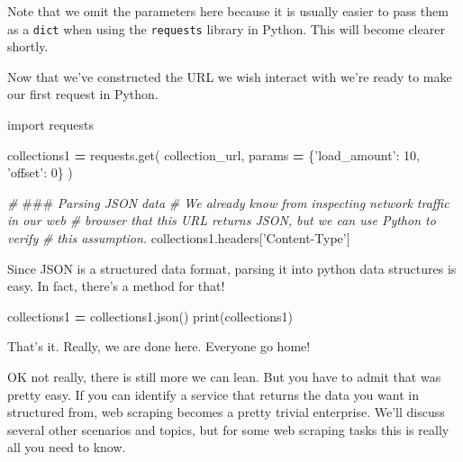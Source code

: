 \documentclass[]{book}
\newenvironment{Shaded}{\begin{snugshade}}{\end{snugshade}}
\newcommand{\DecValTok}[1]{\textcolor[rgb]{0.00,0.00,0.81}{#1}}
\newcommand{\StringTok}[1]{\textcolor[rgb]{0.31,0.60,0.02}{#1}}
\newcommand{\ImportTok}[1]{#1}
\newcommand{\CommentTok}[1]{\textcolor[rgb]{0.56,0.35,0.01}{\textit{#1}}}
\newcommand{\OperatorTok}[1]{\textcolor[rgb]{0.81,0.36,0.00}{\textbf{#1}}}
\newcommand{\BuiltInTok}[1]{#1}
\newcommand{\AlertTok}[1]{\textcolor[rgb]{0.94,0.16,0.16}{#1}}
\newcommand{\NormalTok}[1]{#1}
\begin{document}
Note that we omit the parameters here because it is usually easier to
pass them as a \texttt{dict} when using the \texttt{requests} library in
Python. This will become clearer shortly.

Now that we've constructed the URL we wish interact with we're ready to
make our first request in Python.

\begin{Shaded}
\begin{Highlighting}[]
\ImportTok{import}\NormalTok{ requests}

\NormalTok{collections1 }\OperatorTok{=}\NormalTok{ requests.get(}
\NormalTok{    collection_url,}
\NormalTok{    params }\OperatorTok{=}\NormalTok{ \{}\StringTok{'load_amount'}\NormalTok{: }\DecValTok{10}\NormalTok{,}
                  \StringTok{'offset'}\NormalTok{: }\DecValTok{0}\NormalTok{\}}
\NormalTok{)}
\end{Highlighting}
\end{Shaded}

\begin{Shaded}
\begin{Highlighting}[]
\CommentTok{# }\AlertTok{###}\CommentTok{ Parsing JSON data}
\CommentTok{# We already know from inspecting network traffic in our web}
\CommentTok{# browser that this URL returns JSON, but we can use Python to verify}
\CommentTok{# this assumption.}
\NormalTok{collections1.headers[}\StringTok{'Content-Type'}\NormalTok{]}
\end{Highlighting}
\end{Shaded}

Since JSON is a structured data format, parsing it into python data
structures is easy. In fact, there's a method for that!

\begin{Shaded}
\begin{Highlighting}[]
\NormalTok{collections1 }\OperatorTok{=}\NormalTok{ collections1.json()}
\BuiltInTok{print}\NormalTok{(collections1)}
\end{Highlighting}
\end{Shaded}

That's it. Really, we are done here. Everyone go home!

OK not really, there is still more we can lean. But you have to admit
that was pretty easy. If you can identify a service that returns the
data you want in structured from, web scraping becomes a pretty trivial
enterprise. We'll discuss several other scenarios and topics, but for
some web scraping tasks this is really all you need to know.
\end{document}
